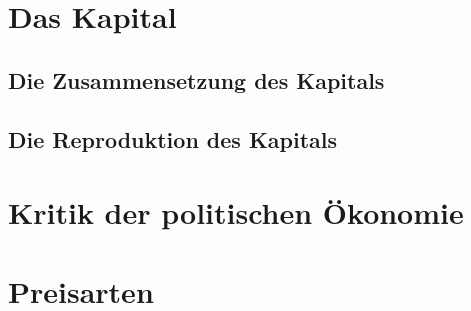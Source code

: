 \documentclass[10pt,a4paper, ngerman]{beamer}
\begin{document}
\section{Das Kapital}
\subsection{Die Zusammensetzung des Kapitals}
\subsection{Die Reproduktion des Kapitals}


\section{Kritik der politischen Ökonomie}

\section{Preisarten}
\end{document}
